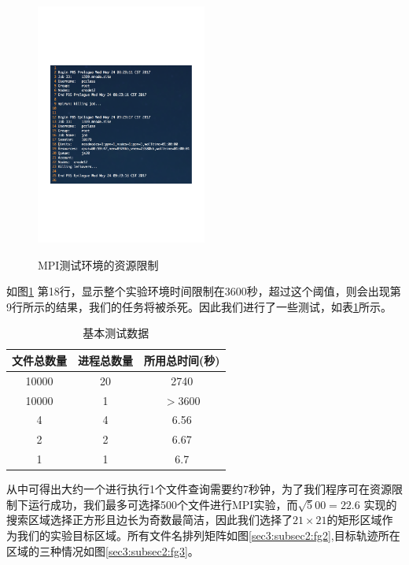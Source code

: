 \documentclass[UTF8]{ctexart}
\begin{document}
\begin{figure}[!htbp]
  \centering
  \includegraphics[width=0.5\textwidth]{fig/fig02.pdf}\\
  \caption{MPI测试环境的资源限制}
  \label{sec3:subsec2:fg1}
\end{figure}

如图\ref{sec3:subsec2:fg1}
第18行，显示整个实验环境时间限制在3600秒，超过这个阈值，则会出现第9行所示的结果，我们的任务将被杀死。因此我们进行了一些测试，如表\ref{sec3:subsec2:tb1}所示。

\begin{table}[!htbp]
  \centering
  \caption{基本测试数据}\label{sec3:subsec2:tb1}
  \begin{tabular}{c|c|c}
    \hline
    文件总数量 & 进程总数量  & 所用总时间(秒) \\
    \hline
    10000 & 20 & 2740 \\
    \hline
    10000 & 1 & $>$3600 \\
    \hline
    4 & 4 & 6.56 \\
    \hline
    2 & 2 & 6.67 \\
    \hline
    1 & 1 & 6.7 \\
    \hline
  \end{tabular}
\end{table}

从中可得出大约一个进行执行1个文件查询需要约7秒钟，为了我们程序可在资源限制下运行成功，我们最多可选择500个文件进行MPI实验，而$\surd500=22.6$
实现的搜索区域选择正方形且边长为奇数最简洁，因此我们选择了$21\times21$的矩形区域作为我们的实验目标区域。所有文件名排列矩阵如图\ref{sec3:subsec2:fg2},目标轨迹所在区域的三种情况如图\ref{sec3:subsec2:fg3}。
\end{document}
